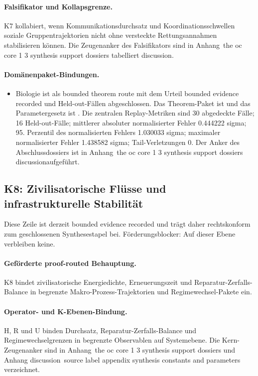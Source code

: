 \paragraph{Falsifikator und Kollapsgrenze.}
K7 kollabiert, wenn Kommunikationsdurchsatz und Koordinationsschwellen soziale Gruppentrajektorien nicht ohne versteckte Rettungsannahmen stabilisieren können.
Die Zeugenanker des Falsifikators sind in Anhang~the oc core 1 3 synthesis support dossiers tabelliert discussion.

\paragraph{Domänenpaket-Bindungen.}
\begin{itemize}[leftmargin=1.6em,nosep]
\item Biologie ist als bounded theorem route mit dem Urteil bounded evidence recorded und  Held-out-Fällen abgeschlossen. Das Theorem-Paket ist  und das Parametergesetz ist . Die zentralen Replay-Metriken sind 30 abgedeckte Fälle; 16 Held-out-Fälle; mittlerer absoluter normalisierter Fehler 0.444222 sigma; 95. Perzentil des normalisierten Fehlers 1.030033 sigma; maximaler normalisierter Fehler 1.438582 sigma; Tail-Verletzungen 0. Der Anker des Abschlussdossiers ist in Anhang~the oc core 1 3 synthesis support dossiers discussionaufgeführt.
\end{itemize}

\subsection{K8: Zivilisatorische Flüsse und infrastrukturelle Stabilität}
\label{sec:oc-core-1-3-synthesis-k8}
Diese Zeile ist derzeit bounded evidence recorded und trägt daher rechtskonform zum geschlossenen Synthesestapel bei.
Förderungsblocker: Auf dieser Ebene verbleiben keine.

\paragraph{Geförderte proof-routed Behauptung.}
K8 bindet zivilisatorische Energiedichte, Erneuerungszeit und Reparatur-Zerfalls-Balance in begrenzte Makro-Prozess-Trajektorien und Regimewechsel-Pakete ein.

\paragraph{Operator- und K-Ebenen-Bindung.}
H, R und U binden Durchsatz, Reparatur-Zerfalls-Balance und Regimewechselgrenzen in begrenzte Observablen auf Systemebene.
Die Kern-Zeugenanker sind in Anhang~the oc core 1 3 synthesis support dossiers und Anhang discussion~source label appendix synthesis constants and parameters verzeichnet.

